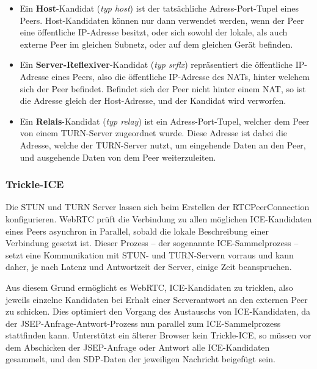 \begin{itemize}
	\item Ein \textbf{Host}-Kandidat (\textit{typ host}) ist der tatsächliche Adress-Port-Tupel eines Peers. Host-Kandidaten können nur dann verwendet werden, wenn der Peer eine öffentliche \acs{IP}-Adresse besitzt, oder sich sowohl der lokale, als auch externe Peer im gleichen Subnetz, oder auf dem gleichen Gerät befinden.
	\item Ein \textbf{Server-Reflexiver}-Kandidat (\textit{typ srflx}) repräsentiert die öffentliche \acs{IP}-Adresse eines Peers, also die öffentliche \acs{IP}-Adresse des \acs{NAT}s, hinter welchem sich der Peer befindet. Befindet sich der Peer nicht hinter einem \acs{NAT}, so ist die Adresse gleich der Host-Adresse, und der Kandidat wird verworfen.
	\item Ein \textbf{Relais}-Kandidat (\textit{typ relay}) ist ein Adress-Port-Tupel, welcher dem Peer von einem \acs{TURN}-Server zugeordnet wurde. Diese Adresse ist dabei die Adresse, welche der \acs{TURN}-Server nutzt, um eingehende Daten an den Peer, und ausgehende Daten von dem Peer weiterzuleiten.
\end{itemize}

\subsubsection{Trickle-ICE}
Die \acs{STUN} und \acs{TURN} Server lassen sich beim Erstellen der RTCPeerConnection konfigurieren. \acs{WebRTC} prüft die Verbindung zu allen möglichen \acs{ICE}-Kandidaten eines Peers asynchron in Parallel, sobald die lokale Beschreibung einer Verbindung gesetzt ist. Dieser Prozess -- der sogenannte \glqq{}\acs{ICE}-Sammelprozess\grqq{} -- setzt eine Kommunikation mit \acs{STUN}- und \acs{TURN}-Servern vorraus und kann daher, je nach Latenz und Antwortzeit der Server, einige Zeit beanspruchen.\par

Aus diesem Grund ermöglicht es \acs{WebRTC}, \acs{ICE}-Kandidaten zu \glqq{}tricklen\grqq{}, also jeweils einzelne Kandidaten bei Erhalt einer Serverantwort an den externen Peer zu schicken. Dies optimiert den Vorgang des Austauschs von \acs{ICE}-Kandidaten, da der \acs{JSEP}-Anfrage-Antwort-Prozess nun parallel zum \acs{ICE}-Sammelprozess stattfinden kann. Unterstützt ein älterer Browser kein \glqq{}Trickle-\acs{ICE}\grqq{}, so müssen vor dem Abschicken der \acs{JSEP}-Anfrage oder Antwort alle \acs{ICE}-Kandidaten gesammelt, und den \acs{SDP}-Daten der jeweiligen Nachricht beigefügt sein.\par

